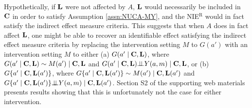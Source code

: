 \documentclass[12pt]{article}
\def\ci{\mbox{\ensuremath{\perp\!\!\!\perp}}}
\begin{document}
Hypothetically, if ${\bf L}$ were not affected by $A$, ${\bf L}$ would necessarily be included in ${\bf C}$ in order to satisfy Assumption \ref{assn:NUCA-MY}, and the NIE$^{\mathrm{R}}$ would in fact satisfy the indirect effect measure criteria. This suggests that when $A$ does in fact affect $\bf L$, one might be able to recover an identifiable effect satisfying the indirect effect measure criteria by replacing the intervention setting $M$ to $G(a')$ with an intervention setting $M$ to either (a) $G(a'\mid {\bf C}, {\bf L})$, where $G(a'\mid {\bf C}, {\bf L})\sim M(a')\mid {\bf C}, {\bf L}$ and $G(a'\mid {\bf C}, {\bf L})\ci Y(a,m)\mid {\bf C}, {\bf L}$, or (b) $G\{a'\mid {\bf C}, {\bf L}(a')\}$, where $G\{a'\mid {\bf C}, {\bf L}(a')\}\sim M(a')\mid {\bf C}, {\bf L}(a')$ and $G\{a'\mid {\bf C}, {\bf L}(a')\}\ci Y(a,m)\mid {\bf C}, {\bf L}(a')$. Section S2 of the supporting web materials presents results showing that this is unfortunately not the case for either intervention.
\end{document}
